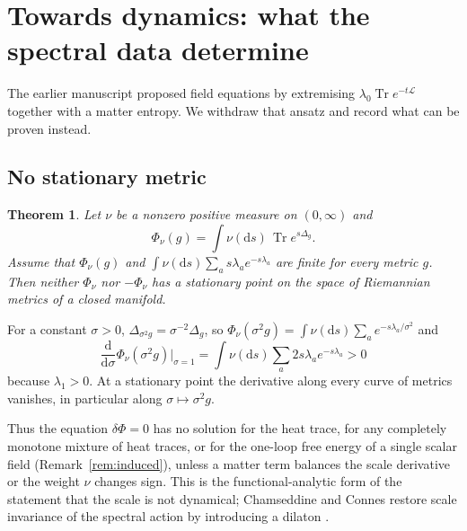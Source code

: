 \documentclass[11pt,a4paper]{article}
\makeatletter
\theoremstyle{stmt}
\newtheorem{theorem}{Theorem}[section]
\theoremstyle{defn}
\theoremstyle{rmk}
\renewenvironment{proof}[1][\proofname]{\par\pushQED{\qed}\normalfont\topsep6\p@\@plus6\p@\relax
  \trivlist\item[\hskip\labelsep{\sffamily\itshape\small #1.}]\ignorespaces}{\popQED\endtrivlist\@endpefalse}
\numberwithin{equation}{section}
\DeclareMathOperator{\Tr}{Tr}
\newcommand{\Lc}{\mathcal{L}}
\newcommand{\dd}{\mathrm{d}}
\makeatother
\begin{document}
\section{Towards dynamics: what the spectral data determine}\label{sec:dyn}

The earlier manuscript proposed field equations by extremising $\lambda_0\Tr e^{-t\Lc}$ together with a matter entropy. We withdraw that ansatz and record what can be proven instead.

\subsection{No stationary metric}

\begin{theorem}\label{thm:nostat}
Let $\nu$ be a nonzero positive measure on $(0,\infty)$ and
\begin{equation}
\Phi_\nu(g)=\int\nu(\dd s)\,\Tr e^{s\Delta_g}.
\end{equation}
Assume that $\Phi_\nu(g)$ and $\int\nu(\dd s)\sum_as\lambda_ae^{-s\lambda_a}$ are finite for every metric $g$. Then neither $\Phi_\nu$ nor $-\Phi_\nu$ has a stationary point on the space of Riemannian metrics of a closed manifold.
\end{theorem}

\begin{proof}
For a constant $\sigma>0$, $\Delta_{\sigma^2g}=\sigma^{-2}\Delta_g$, so $\Phi_\nu(\sigma^2g)=\int\nu(\dd s)\sum_ae^{-s\lambda_a/\sigma^2}$ and
\begin{equation}
\frac{\dd}{\dd\sigma}\Phi_\nu(\sigma^2g)\Big|_{\sigma=1}=\int\nu(\dd s)\sum_a2s\lambda_ae^{-s\lambda_a}>0
\end{equation}
because $\lambda_1>0$. At a stationary point the derivative along every curve of metrics vanishes, in particular along $\sigma\mapsto\sigma^2g$.
\end{proof}

Thus the equation $\delta\Phi=0$ has no solution for the heat trace, for any completely monotone mixture of heat traces, or for the one-loop free energy of a single scalar field (Remark~\ref{rem:induced}), unless a matter term balances the scale derivative or the weight $\nu$ changes sign. This is the functional-analytic form of the statement that the scale is not dynamical; Chamseddine and Connes restore scale invariance of the spectral action by introducing a dilaton \cite{CC06}.
\end{document}

